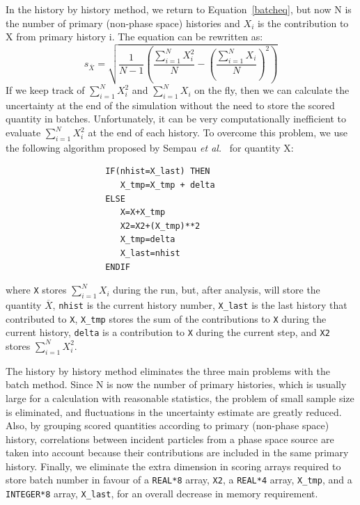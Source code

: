 \documentclass[12pt,twoside]{article}  %
\begin{document}
In the history by history method, we return to Equation~\ref{batcheq}, but
now N is the number of primary (non-phase space) histories and
$X_i$ is the contribution to X from primary history i.  The equation can
be rewritten as:
\begin{equation}
s_{\overline{X}} = \sqrt{\frac{1}{N-1}\left(\frac{\sum_{i=1}^{N}X_i^2}{N}-\left(\frac{\sum_{i=1}^{N}X_i}{N}\right)^2\right)}
\label{histeq}
\end{equation}
If we keep track of $\sum_{i=1}^{N}X_i^2$ and $\sum_{i=1}^{N}X_i$ on the fly,
then we can calculate the uncertainty at the end of the simulation without
the need to store the scored quantity in batches.  Unfortunately,
it can be
very computationally inefficient to evaluate $\sum_{i=1}^{N}X_i^2$
at the end of each history.  To overcome this
problem, we use the following algorithm proposed by
Sempau {\it et al.}~\cite{Se01} for quantity X:
\begin{verbatim}
                    IF(nhist=X_last) THEN
                       X_tmp=X_tmp + delta
                    ELSE
                       X=X+X_tmp
                       X2=X2+(X_tmp)**2
                       X_tmp=delta
                       X_last=nhist
                    ENDIF
\end{verbatim}
where {\tt X} stores $\sum_{i=1}^{N}X_i$ during the run, but, after analysis,
will store the quantity $\overline{X}$,
{\tt nhist} is the current history number, {\tt X\_last} is the last history
that contributed to {\tt X}, {\tt X\_tmp} stores the sum of the contributions
to {\tt X} during the current history, {\tt delta} is a contribution to
{\tt X} during the current step,
and {\tt X2} stores $\sum_{i=1}^{N}X_i^2$.

The history by history method eliminates the three main problems with the
batch method.  Since N is now the number of primary histories, which is usually
large for a calculation with reasonable statistics, the problem of small
sample size is eliminated, and fluctuations in the uncertainty estimate are
greatly reduced.   Also, by grouping scored quantities according to primary
(non-phase space) history, correlations between incident particles from
a phase space source are taken into account because their contributions are
included in the same primary history.  Finally, we eliminate the extra dimension
in scoring arrays required to store batch number in favour of
a {\tt REAL*8} array, {\tt X2}, a {\tt REAL*4} array,
{\tt X\_tmp}, and a {\tt INTEGER*8} array, {\tt X\_last}, for an overall
decrease in memory requirement.
\end{document}
